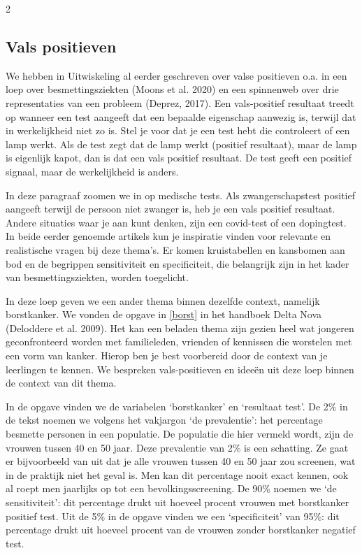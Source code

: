 \begin{multicols} {2}
\subsection{Vals positieven}
\label{par:valspos}
We hebben in Uitwiskeling al eerder geschreven over valse positieven o.a. in een loep over besmettingsziekten (Moons et al. 2020) en een spinnenweb over drie representaties van een probleem (Deprez, 2017). Een vals-positief resultaat treedt op wanneer een test aangeeft dat een bepaalde eigenschap aanwezig is, terwijl dat in werkelijkheid niet zo is. Stel je voor dat je een test hebt die controleert of een lamp werkt. Als de test zegt dat de lamp werkt (positief resultaat), maar de lamp is eigenlijk kapot, dan is dat een vals positief resultaat. De test geeft een positief signaal, maar de werkelijkheid is anders. 

In deze paragraaf zoomen we in op medische tests. Als  zwangerschapstest positief aangeeft terwijl de persoon niet zwanger is, heb je een vals positief resultaat. Andere situaties waar je aan kunt denken, zijn een covid-test of een dopingtest. In beide eerder genoemde artikels kun je inspiratie vinden voor relevante en realistische vragen bij deze thema’s. Er komen kruistabellen en kansbomen aan bod en de begrippen sensitiviteit en specificiteit, die belangrijk zijn in het kader van besmettingsziekten, worden toegelicht.

In deze loep geven we een ander thema binnen dezelfde context, namelijk borstkanker. We vonden de opgave in \autoref{borst} in het handboek Delta Nova (Deloddere et al. 2009). Het kan een beladen thema zijn gezien heel wat jongeren geconfronteerd worden met familieleden, vrienden of kennissen die worstelen met een vorm van kanker. Hierop ben je best voorbereid door de context van je leerlingen te kennen. We bespreken vals-positieven en ideeën uit deze loep binnen de context van dit thema. 

In de opgave vinden we de variabelen ‘borstkanker’ en ‘resultaat test’. 
De 2\% in de tekst noemen we volgens het vakjargon ‘de prevalentie’: het percentage besmette personen in een populatie. De populatie die hier vermeld wordt, zijn de vrouwen tussen 40 en 50 jaar. Deze prevalentie van 2\% is een schatting. Ze gaat er bijvoorbeeld van uit dat je alle vrouwen tussen 40 en 50 jaar zou screenen, wat in de praktijk niet het geval is. Men kan dit percentage nooit exact kennen, ook al roept men jaarlijks op tot een bevolkingsscreening. 
De 90\% noemen we ‘de sensitiviteit’: dit percentage drukt uit hoeveel procent vrouwen met borstkanker positief test.
Uit de 5\% in de opgave vinden we een ‘specificiteit’ van 95\%: dit percentage drukt uit hoeveel procent van de vrouwen zonder borstkanker negatief test.



\end{multicols}
